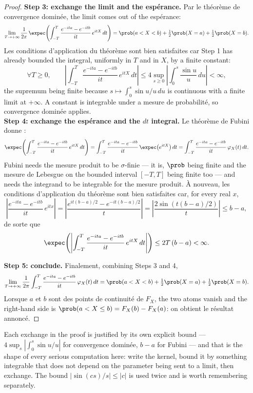 \begin{proof}
\textbf{Step 3: exchange the limit and the espérance.} Par le théorème de convergence
dominée, the limit comes out of the espérance:
\[
  \lim_{T \to +\infty} \frac{1}{2\pi}\,\expec\!\left(\int_{-T}^{T} \frac{e^{-ita} -
  e^{-itb}}{it}\,e^{itX}\,dt\right) = \prob(a < X < b) + \tfrac{1}{2}\prob(X = a) +
  \tfrac{1}{2}\prob(X = b).
\]
Les conditions d'application du théorème sont bien satisfaites car Step 1 has already bounded
the integral, uniformly in $T$ and in $X$, by a finite constant:
\[
  \forall T \geq 0, \qquad \left|\int_{-T}^{T} \frac{e^{-ita} -
  e^{-itb}}{it}\,e^{itX}\,dt\right| \leq 4 \sup_{s \geq 0} \left|\int_{0}^{s} \frac{\sin
  u}{u}\,du\right| < \infty,
\]
the supremum being finite because $s \mapsto \int_{0}^{s}\sin u / u\,du$ is continuous with
a finite limit at $+\infty$. A constant is integrable under a mesure de probabilité, so
convergence dominée applies.\\

\textbf{Step 4: exchange the espérance and the $dt$ integral.} Le théorème de Fubini donne :
\[
  \expec\!\left(\int_{-T}^{T} \frac{e^{-ita} - e^{-itb}}{it}\,e^{itX}\,dt\right) =
  \int_{-T}^{T} \frac{e^{-ita} - e^{-itb}}{it}\,\expec\!\left(e^{itX}\right)dt =
  \int_{-T}^{T} \frac{e^{-ita} - e^{-itb}}{it}\,\varphi_{X}(t)\,dt.
\]
Fubini needs the mesure produit to be $\sigma$-finie --- it is, $\prob$ being finite and the
mesure de Lebesgue on the bounded interval $[-T,T]$ being finite too --- and needs the integrand
to be integrable for the mesure produit. À nouveau, les conditions d'application du théorème
sont bien satisfaites car, for every real $x$,
\[
  \left|\frac{e^{-ita} - e^{-itb}}{it}\,e^{itx}\right| = \left|\frac{e^{it(b-a)/2} -
  e^{-it(b-a)/2}}{t}\right| = \left|\frac{2\sin\!\left(t(b-a)/2\right)}{t}\right| \leq b -
  a,
\]
de sorte que
\[
  \expec\!\left(\left|\int_{-T}^{T} \frac{e^{-ita} -
  e^{-itb}}{it}\,e^{itX}\,dt\right|\right) \leq 2T\,(b-a) < \infty.
\]

\textbf{Step 5: conclude.} Finalement, combining Steps 3 and 4,
\[
  \lim_{T \to +\infty} \frac{1}{2\pi}\int_{-T}^{T} \frac{e^{-ita} -
  e^{-itb}}{it}\,\varphi_{X}(t)\,dt = \prob(a < X < b) + \tfrac{1}{2}\prob(X = a) +
  \tfrac{1}{2}\prob(X = b).
\]
Lorsque $a$ et $b$ sont des points de continuité de $F_{X}$, the two atoms vanish and the
right-hand side is $\prob(a < X \leq b) = F_{X}(b) - F_{X}(a)$: on obtient le résultat
annoncé.
\end{proof}

\begin{remark}
Each exchange in the proof is justified by its own explicit bound --- $4\sup_{s}
\left|\int_{0}^{s}\sin u/u\right|$ for convergence dominée, $b-a$ for Fubini --- and that is
the shape of every serious computation here: write the kernel, bound it by something
integrable that does not depend on the parameter being sent to a limit, then exchange. The
bound $\left|\sin(cs)/s\right| \leq |c|$ is used twice and is worth remembering separately.
\end{remark}

